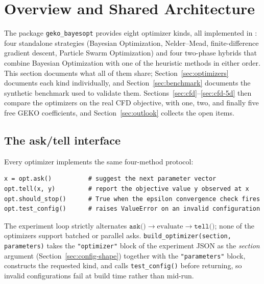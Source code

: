 \maketitle
\tableofcontents
\clearpage
\section{Overview and Shared Architecture}
\label{sec:architecture}

The package \texttt{geko\_bayesopt} provides eight optimizer kinds, all
implemented in : four standalone
strategies (Bayesian Optimization, Nelder--Mead, finite-difference gradient
descent, Particle Swarm Optimization) and four two-phase hybrids that combine
Bayesian Optimization with one of the heuristic methods in either order.
This section documents what all of them share; Section~\ref{sec:optimizers}
documents each kind individually, and Section~\ref{sec:benchmark} documents
the synthetic benchmark used to validate them.
Sections~\ref{sec:cfd}--\ref{sec:cfd-5d} then compare the optimizers on the
real CFD objective, with one, two, and finally five free GEKO coefficients,
and Section~\ref{sec:outlook} collects the open items.

\subsection{The ask/tell interface}

Every optimizer implements the same four-method protocol:

\begin{lstlisting}
x = opt.ask()          # suggest the next parameter vector
opt.tell(x, y)         # report the objective value y observed at x
opt.should_stop()      # True when the epsilon convergence check fires
opt.test_config()      # raises ValueError on an invalid configuration
\end{lstlisting}

The experiment loop strictly alternates
$\texttt{ask()} \rightarrow \text{evaluate} \rightarrow \texttt{tell()}$;
none of the optimizers support batched or parallel asks.
\texttt{build\_optimizer(section, parameters)} takes the \texttt{"optimizer"}
block of the experiment JSON as the \emph{section} argument
(Section~\ref{sec:config-shape}) together with the \texttt{"parameters"}
block, constructs the requested kind, and calls \texttt{test\_config()}
before returning, so invalid configurations fail at build time rather than
mid-run.

